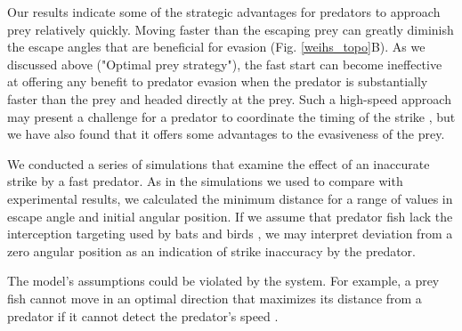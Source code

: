 \documentclass[12pt]{article}
\begin{document}
Our results indicate some of the strategic advantages for predators to approach prey relatively quickly. Moving faster than the escaping prey can greatly diminish the escape angles that are beneficial for evasion (Fig. \ref{weihs_topo}B). As we discussed above ("Optimal prey strategy"), the fast start can become ineffective at offering any benefit to predator evasion when the predator is substantially faster than the prey and headed directly at the prey. Such a high-speed approach may present a challenge for a predator to coordinate the timing of the strike \citep{Higham:2007go, Higham:2005iu}, but we have also found that it offers some advantages to the evasiveness of the prey. 

We conducted a series of simulations that examine the effect of an inaccurate strike by a fast predator. As in the simulations we used to compare with experimental results, we calculated the minimum distance for a range of values in escape angle and initial angular position. If we assume that predator fish lack the interception targeting used by bats \cite{Ghose:2006dk} and birds \cite{Kane:2014fs}, we may interpret deviation from a zero angular position as an indication of strike inaccuracy by the predator. 



The model's assumptions could be violated by the system. For example, a prey fish cannot move in an optimal direction that maximizes its distance from a predator if it cannot detect the predator's speed \citep{Weihs:1984tb}.


\pagebreak



\end{document}
